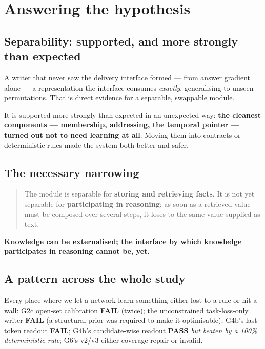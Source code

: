 \documentclass[11pt, a4paper]{article}
\newcommand{\PASS}{\textcolor{green!45!black}{\textbf{PASS}}}
\newcommand{\FAIL}{\textcolor{red!70!black}{\textbf{FAIL}}}
\begin{document}
\section{Answering the hypothesis}

\subsection{Separability: supported, and more strongly than expected}

A writer that never saw the delivery interface formed --- from answer gradient alone --- a
representation the interface consumes \emph{exactly}, generalising to unseen permutations.
That is direct evidence for a separable, swappable module.

It is supported more strongly than expected in an unexpected way: \textbf{the cleanest
components --- membership, addressing, the temporal pointer --- turned out not to need
learning at all}. Moving them into contracts or deterministic rules made the system both
better and safer.

\subsection{The necessary narrowing}

\begin{quote}
The module is separable for \textbf{storing and retrieving facts}. It is not yet separable
for \textbf{participating in reasoning}: as soon as a retrieved value must be composed over
several steps, it loses to the same value supplied as text.
\end{quote}

\textbf{Knowledge can be externalised; the interface by which knowledge participates in
reasoning cannot be, yet.}

\subsection{A pattern across the whole study}

Every place where we let a network learn something either lost to a rule or hit a wall:
G2c open-set calibration \FAIL{} (twice); the unconstrained task-loss-only writer \FAIL{}
(a structural prior was required to make it optimisable); G4b's last-token readout
\FAIL{}; G4b's candidate-wise readout \PASS{} \emph{but beaten by a 100\% deterministic
rule}; G6's v2/v3 either coverage repair or invalid.
\end{document}
